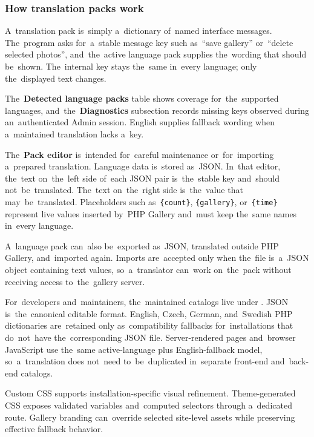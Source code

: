 \documentclass[11pt,a4paper]{article}
\newcommand{\filepath}[1]{\path{#1}}
\newcommand{\ui}[1]{\textbf{#1}}
\newcommand{\codeword}[1]{\nolinkurl{#1}}
\begin{document}
\subsubsection{How translation packs work}

A~translation pack is~simply a~dictionary of~named interface messages.
The~program asks for~a~stable message key such as~``save gallery'' or~``delete
selected photos'', and~the~active language pack supplies the~wording that should
be~shown. The~internal key stays the~same in~every language; only the~displayed
text changes.

The~\ui{Detected language packs} table shows coverage for~the~supported
languages, and~the~\ui{Diagnostics} subsection records missing keys observed
during an~authenticated Admin session. English supplies fallback wording when
a~maintained translation lacks a~key.

The~\ui{Pack editor} is~intended for~careful maintenance or~for~importing
a~prepared translation. Language data is~stored as~JSON. In~that editor,
the~text on~the~left side of~each JSON pair is~the~stable key and~should
not~be~translated. The~text on~the~right side is~the~value that
may~be~translated. Placeholders such as~\codeword{\{count\}},
\codeword{\{gallery\}}, or~\codeword{\{time\}} represent live values inserted
by~PHP Gallery and~must keep the~same names in~every language.

A~language pack can~also be~exported as~JSON, translated outside PHP Gallery,
and~imported again. Imports are~accepted only when the~file is~a~JSON object
containing text values, so~a~translator can~work on~the~pack without receiving
access to~the~gallery server.

For~developers and~maintainers, the~maintained catalogs live under
\filepath{app/lang/}. JSON is~the~canonical editable format. English, Czech,
German, and~Swedish PHP dictionaries are~retained only as~compatibility
fallbacks for~installations that do~not~have the~corresponding JSON file.
Server-rendered pages and~browser JavaScript use the~same active-language plus
English-fallback model, so~a~translation does not~need to~be~duplicated
in~separate front-end and~back-end catalogs.

Custom CSS supports installation-specific visual refinement. Theme-generated CSS
exposes validated variables and~computed selectors through a~dedicated route.
Gallery branding can~override selected site-level assets while preserving
effective fallback behavior.
\end{document}
